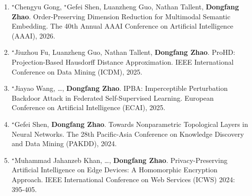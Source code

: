 \documentclass[11pt]{scrartcl}
\begin{document}
\begin{enumerate}
\item 	$^\star$Chengyu Gong, $^\star$Gefei Shen, Luanzheng Guo, Nathan Tallent, \textbf{Dongfang Zhao}.
Order-Preserving Dimension Reduction for Multimodal Semantic Embedding. 
The 40th Annual AAAI Conference on Artificial Intelligence (AAAI), 2026.

\item 	$^\star$Jiuzhou Fu, Luanzheng Guo, Nathan Tallent, \textbf{Dongfang Zhao}.
ProHD: Projection-Based Hausdorff Distance Approximation. 
IEEE International Conference on Data Mining (ICDM), 2025.

\item 	$^\star$Jiayao Wang, \dots, \textbf{Dongfang Zhao}.
IPBA: Imperceptible Perturbation Backdoor Attack in Federated Self-Supervised Learning. 
European Conference on Artificial Intelligence (ECAI), 2025.


\item 	$^\star$Gefei Shen, \textbf{Dongfang Zhao}.
Towards Nonparametric Topological Layers in Neural Networks. 
The 28th Pacific-Asia Conference on Knowledge Discovery and Data Mining (PAKDD), 2024.

\item $^\star$Muhammad Jahanzeb Khan, \dots, \textbf{Dongfang Zhao}.
Privacy-Preserving Artificial Intelligence on Edge Devices: A Homomorphic Encryption Approach. IEEE International Conference on Web Services (ICWS) 2024: 395-405.





\end{enumerate}
\end{document}
